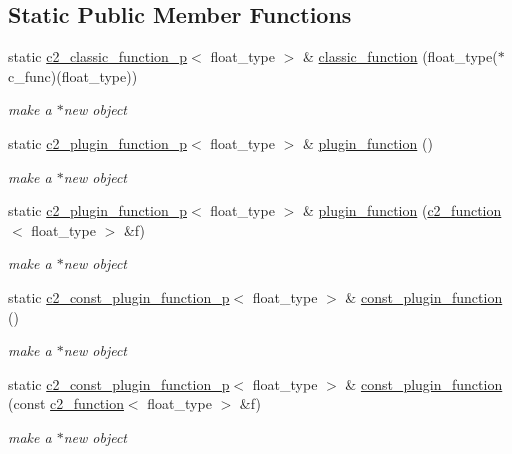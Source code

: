 \subsection*{Static Public Member Functions}
\begin{DoxyCompactItemize}
\item 
static \hyperlink{classc2__classic__function__p}{c2\+\_\+classic\+\_\+function\+\_\+p}$<$ float\+\_\+type $>$ \& \hyperlink{classc2__factory_ae5c9140b2bfcc6416682562b99479974}{classic\+\_\+function} (float\+\_\+type($\ast$c\+\_\+func)(float\+\_\+type))
\begin{DoxyCompactList}\small\item\em make a $\ast$new object \end{DoxyCompactList}\item 
static \hyperlink{classc2__plugin__function__p}{c2\+\_\+plugin\+\_\+function\+\_\+p}$<$ float\+\_\+type $>$ \& \hyperlink{classc2__factory_aaea82fa4f0b1f0183314a45923a3b673}{plugin\+\_\+function} ()
\begin{DoxyCompactList}\small\item\em make a $\ast$new object \end{DoxyCompactList}\item 
static \hyperlink{classc2__plugin__function__p}{c2\+\_\+plugin\+\_\+function\+\_\+p}$<$ float\+\_\+type $>$ \& \hyperlink{classc2__factory_a1481619ba45f2edb065a6cafc3c8d492}{plugin\+\_\+function} (\hyperlink{classc2__function}{c2\+\_\+function}$<$ float\+\_\+type $>$ \&f)
\begin{DoxyCompactList}\small\item\em make a $\ast$new object \end{DoxyCompactList}\item 
static \hyperlink{classc2__const__plugin__function__p}{c2\+\_\+const\+\_\+plugin\+\_\+function\+\_\+p}$<$ float\+\_\+type $>$ \& \hyperlink{classc2__factory_aebeb20651a347e1fa8f14118faf2588e}{const\+\_\+plugin\+\_\+function} ()
\begin{DoxyCompactList}\small\item\em make a $\ast$new object \end{DoxyCompactList}\item 
static \hyperlink{classc2__const__plugin__function__p}{c2\+\_\+const\+\_\+plugin\+\_\+function\+\_\+p}$<$ float\+\_\+type $>$ \& \hyperlink{classc2__factory_ae377e5df1c8b6eb95b5b02cf8da0667d}{const\+\_\+plugin\+\_\+function} (const \hyperlink{classc2__function}{c2\+\_\+function}$<$ float\+\_\+type $>$ \&f)
\begin{DoxyCompactList}\small\item\em make a $\ast$new object \end{DoxyCompactList}\item 

\end{DoxyCompactItemize}
